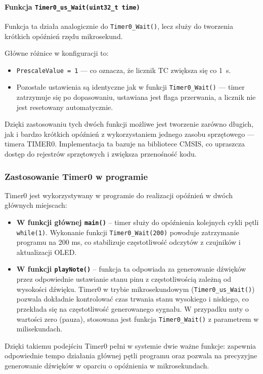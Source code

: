 \paragraph{Funkcja \texttt{Timer0\_us\_Wait(uint32\_t time)}}

Funkcja ta działa analogicznie do \texttt{Timer0\_Wait()}, lecz służy do tworzenia krótkich opóźnień rzędu mikrosekund.

Główne różnice w konfiguracji to:

\begin{itemize}
    \item \texttt{PrescaleValue = 1} — co oznacza, że licznik TC zwiększa się co 1~\textmu s.
    \item Pozostałe ustawienia są identyczne jak w funkcji \texttt{Timer0\_Wait()} — timer zatrzymuje się po dopasowaniu, ustawiana jest flaga przerwania, a licznik nie jest resetowany automatycznie.
\end{itemize}

Dzięki zastosowaniu tych dwóch funkcji możliwe jest tworzenie zarówno długich, jak i bardzo krótkich opóźnień z wykorzystaniem jednego zasobu sprzętowego — timera TIMER0. Implementacja ta bazuje na bibliotece CMSIS, co upraszcza dostęp do rejestrów sprzętowych i zwiększa przenośność kodu.

\subsubsection{Zastosowanie Timer0 w programie}

Timer0 jest wykorzystywany w programie do realizacji opóźnień w dwóch głównych miejscach:

\begin{itemize}
    \item \textbf{W funkcji głównej \texttt{main()}} – timer służy do opóźnienia kolejnych cykli pętli \texttt{while(1)}. Wykonanie funkcji \texttt{Timer0\_Wait(200)} powoduje zatrzymanie programu na 200 ms, co stabilizuje częstotliwość odczytów z czujników i aktualizacji OLED.
    
    \item \textbf{W funkcji \texttt{playNote()}} – funkcja ta odpowiada za generowanie dźwięków przez odpowiednie ustawianie stanu pinu z częstotliwością zależną od wysokości dźwięku. Timer0 w trybie mikrosekundowym (\texttt{Timer0\_us\_Wait()}) pozwala dokładnie kontrolować czas trwania stanu wysokiego i niskiego, co przekłada się na częstotliwość generowanego sygnału. W przypadku nuty o wartości zero (pauza), stosowana jest funkcja \texttt{Timer0\_Wait()} z parametrem w milisekundach.
\end{itemize}

Dzięki takiemu podejściu Timer0 pełni w systemie dwie ważne funkcje: zapewnia odpowiednie tempo działania głównej pętli programu oraz pozwala na precyzyjne generowanie dźwięków w oparciu o opóźnienia w mikrosekundach.

